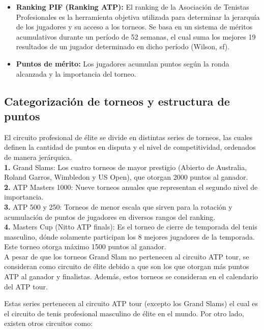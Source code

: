 \documentclass[oneside,11pt]{Latex/Classes/PhDthesisPSnPDF}
\begin{document}
\begin{itemize}
\item \textbf{Ranking PIF (Ranking ATP):} El ranking de la Asociación de Tenistas Profesionales es la herramienta objetiva utilizada para determinar la jerarquía de los jugadores y su acceso a los torneos. Se basa en un sistema de méritos acumulativos durante un período de 52 semanas, el cual suma los mejores 19 resultados de un jugador determinado en dicho período (Wilson, sf).
\item \textbf{Puntos de mérito:} Los jugadores acumulan puntos según la ronda alcanzada y la importancia del torneo.

\end{itemize}

\subsection{Categorización de torneos y estructura de puntos}

El circuito profesional de élite se divide en distintas series de
torneos, las cuales definen la cantidad de puntos en disputa y el nivel
de competitividad, ordenados de manera jerárquica.\\

\textbf{1.} Grand Slams: Los cuatro torneos de mayor prestigio (Abierto
de Australia, Roland Garros, Wimbledon y US Open), que otorgan 2000
puntos al ganador.\\

\textbf{2.} ATP Masters 1000: Nueve torneos anuales que representan el
segundo nivel de importancia.\\

\textbf {3.} ATP 500 y 250: Torneos de menor escala que sirven para la
rotación y acumulación de puntos de jugadores en diversos rangos del
ranking.\\

\textbf{4.} Masters Cup (Nitto ATP finals): Es el torneo de cierre de
temporada del tenis masculino, dónde solamente participan los 8 mejores
jugadores de la temporada. Este torneo otorga máximo 1500 puntos al
ganador.\\

A pesar de que los torneos Grand Slam no pertenecen al circuito ATP
tour, se consideran como circuito de élite debido a que son los que
otorgan más puntos ATP al ganador y finalistas. Además, estos torneos se
consideran en el calendario del ATP tour.

Estas series pertenecen al circuito ATP tour (excepto los Grand Slams)
el cual es el circuito de tenis profesional masculino de élite en el
mundo. Por otro lado, existen otros circuitos como:
\end{document}
